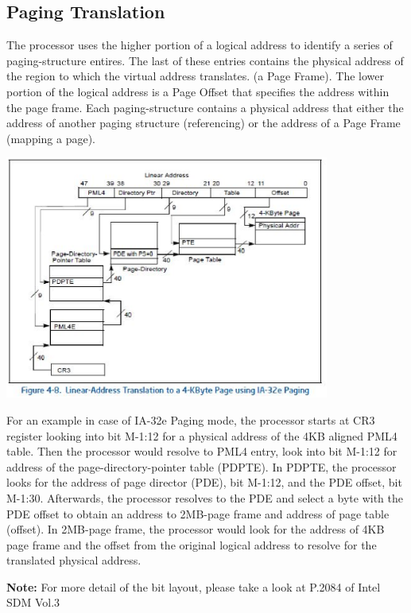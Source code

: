 \documentclass[letterpaper,10pt,titlepage,fleqn]{article}
\begin{document}
\subsection*{Paging Translation}
The processor uses the higher portion of a logical address to identify a series of paging-structure entires.
The last of these entries contains the physical address of the region to which the virtual address translates.
(a Page Frame). The lower portion of the logical address is a Page Offset that specifies the address within 
the page frame.
Each paging-structure contains a physical address that either the address of another paging structure (referencing) or the address of a Page Frame (mapping a page).
\newline
\begin{center}
   \includegraphics[width=0.8\textwidth]{trans_IA32e_4KB.eps}
\end{center}
For an example in case of IA-32e Paging mode, the processor starts at CR3 register looking into bit M-1:12 for
a physical address of the 4KB aligned PML4 table.  Then the processor would resolve to PML4 entry, look into 
bit M-1:12 for address of the page-directory-pointer table (PDPTE). In PDPTE, the processor looks for the 
address of page director (PDE), bit M-1:12, and the PDE offset, bit M-1:30. Afterwards, the processor resolves
to the PDE and select a byte with the PDE offset to obtain an address to 2MB-page frame and address of page 
table (offset). In 2MB-page frame, the processor would look for the address of 4KB page frame and the offset
from the original logical address to resolve for the translated physical address. 

\textbf{Note: } For more detail of the bit layout, please take a look at P.2084 of Intel SDM Vol.3 
\newpage
\end{document}
